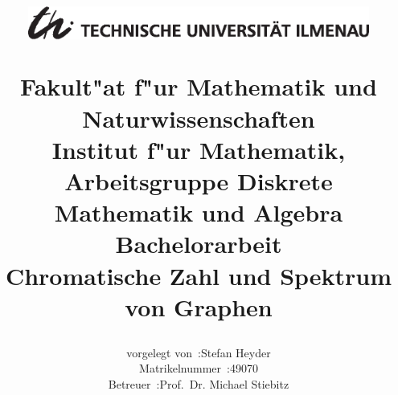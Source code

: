 \documentclass[a4paper,11pt]{article}
\begin{document}
\renewcommand{\baselinestretch}{1.5}\normalsize

\title{
    \begin{figure}[htbp]
        \vspace{-48pt}
        \centering
        \includegraphics[height=36pt]{images/TULogo.eps}
    \end{figure}\vspace{-16pt}
    \Large Fakult"at f"ur Mathematik und Naturwissenschaften\\
    \vspace{5pt}
    \small Institut f"ur Mathematik, Arbeitsgruppe Diskrete Mathematik und Algebra\\
    \vspace{100pt}
  \Huge {\bf Bachelorarbeit}\\
  \vspace{90pt}
    \huge {\bf Chromatische Zahl und Spektrum von Graphen}\\
    \vspace{100pt}
}

\author{
    \begin{tabular}{rl}
      vorgelegt von~:& Stefan Heyder\\
     Matrikelnummer~:& 49070\\
           Betreuer~:& Prof.~Dr. Michael Stiebitz
\end{tabular}
    \vspace{20pt}
}
\date{\datum}
\maketitle
\thispagestyle{empty}

\newpage
\tableofcontents
\thispagestyle{empty}
\newpage
{}




\newpage
{}


%
%
%
%
\end{document}
